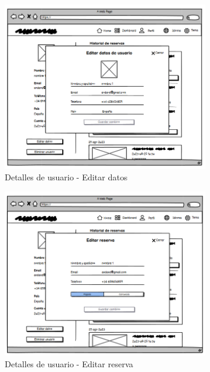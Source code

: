 \begin{figure}[H]
	\centering
	\includegraphics[width=0.8\textwidth]{5-AnalisisDelSistemaDeInformacion/InterfacesDeUsuario/Dashboard/detalles usuario editar datos.png}
	\caption{Detalles de usuario - Editar datos}
\end{figure}

\begin{figure}[H]
	\centering
	\includegraphics[width=0.8\textwidth]{5-AnalisisDelSistemaDeInformacion/InterfacesDeUsuario/Dashboard/detalles usuario editar reserva.png}
	\caption{Detalles de usuario - Editar reserva}
\end{figure}
